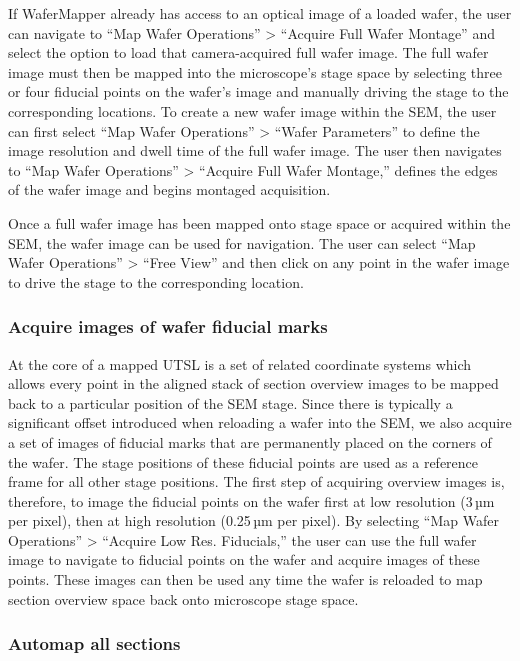 \documentclass{article}
\begin{document}
If WaferMapper already has access to an optical image of a loaded wafer, the user can navigate to “Map Wafer Operations” > “Acquire Full Wafer Montage” and select the option to load that camera-acquired full wafer image. The full wafer image must then be mapped into the microscope’s stage space by selecting three or four fiducial points on the wafer’s image and manually driving the stage to the corresponding locations. To create a new wafer image within the SEM, the user can first select “Map Wafer Operations” > “Wafer Parameters” to define the image resolution and dwell time of the full wafer image. The user then navigates to “Map Wafer Operations” > “Acquire Full Wafer Montage,” defines the edges of the wafer image and begins montaged acquisition.

Once a full wafer image has been mapped onto stage space or acquired within the SEM, the wafer image can be used for navigation. The user can select “Map Wafer Operations” > “Free View” and then click on any point in the wafer image to drive the stage to the corresponding location.

\subsubsection*{Acquire images of wafer fiducial marks}

At the core of a mapped UTSL is a set of related coordinate systems which allows every point in the aligned stack of section overview images to be mapped back to a particular position of the SEM stage. Since there is typically a significant offset introduced when reloading a wafer into the SEM, we also acquire a set of images of fiducial marks that are permanently placed on the corners of the wafer. The stage positions of these fiducial points are used as a reference frame for all other stage positions. The first step of acquiring overview images is, therefore, to image the fiducial points on the wafer first at low resolution (3\,µm per pixel), then at high resolution (0.25\,µm per pixel). By selecting “Map Wafer Operations” > “Acquire Low Res. Fiducials,” the user can use the full wafer image to navigate to fiducial points on the wafer and acquire images of these points. These images can then be used any time the wafer is reloaded to map section overview space back onto microscope stage space.

\subsubsection*{Automap all sections}
\end{document}
